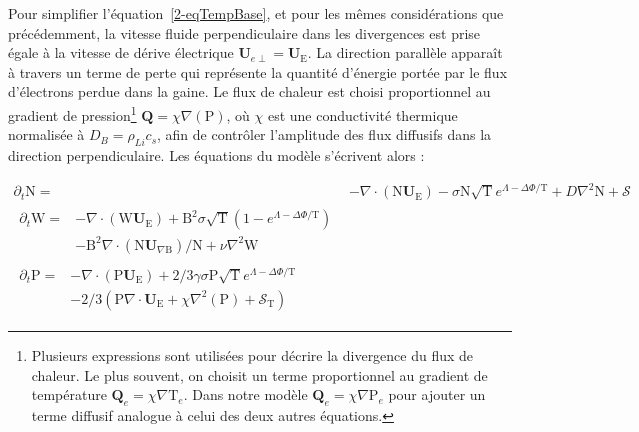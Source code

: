 \begin{refsection}
	Pour simplifier l'équation~\ref{2-eqTempBase}, et pour les mêmes
	considérations que précédemment, la vitesse fluide perpendiculaire dans les
	divergences est prise égale à la vitesse de dérive électrique $\mathbf
	U_{e\perp}=\mathbf U_\text{E}$. La direction parallèle apparaît à travers un
	terme de perte qui représente la quantité d'énergie portée par le flux d'électrons
	perdue dans la gaine.
	Le flux de chaleur est choisi proportionnel au gradient de pression\footnote{Plusieurs expressions
	sont utilisées pour décrire la divergence du flux de chaleur. Le plus souvent,
	on choisit un terme proportionnel au gradient de température 
$\mathbf{Q}_e=\chi\nabla\text{T}_e$. Dans
notre modèle $\mathbf{Q}_e=\chi\nabla\text{P}_e$ pour ajouter un terme diffusif
analogue à celui des deux autres équations.}
$\mathbf{Q}=\chi\nabla(\text{P})$, où $\chi$ est une conductivité thermique
normalisée à $D_B=\rho_{Li}c_s$, afin de contrôler l'amplitude des flux
diffusifs dans la direction perpendiculaire.
	Les équations du modèle s'écrivent alors :
	
\begin{align}
\label{2-eqContinuiteTemp}
\partial_t \text{N}
=& - \nabla\cdot\left(\text{N}\mathbf U_\text{E}\right) -\sigma
\text{N}\sqrt{\text{T}}e^{\Lambda-\Delta\Phi/\text{T}} + D\nabla^2 \text{N}
+ \mathcal{S}
\\[0.5cm]
\label{2-eqCourantTemp}
\begin{split}
\partial_{t}\text{W} =& 
-\nabla\cdot\left(\text{W}\mathbf U_\text{E}\right)
+\text{B}^2\sigma\sqrt{\text{T}}\left(1-e^{\Lambda-\Delta\Phi/\text{T}}\right)\\
&-\text{B}^2\nabla\cdot\left(\text{N}\mathbf
U_{\nabla\text{B}}\right)/\text{N} +\nu\nabla^2\text{W}
\end{split}
\\[0.5cm]
\label{2-eqEnergyTemp}
\begin{split}
\partial_{t}\text{P}=&
-\nabla\cdot\left(\text{P}\mathbf U_\text{E}\right)
+2/3\gamma\sigma\text{P}\sqrt{\text{T}}e^{\Lambda-\Delta\Phi/\text{T}}\\
&-2/3\left(\text{P}\nabla\cdot\mathbf U_\text{E}
+\chi\nabla^2(\text{P})
+\mathcal{S}_{\text{T}}\right)
\end{split}
\end{align}



\end{refsection}

